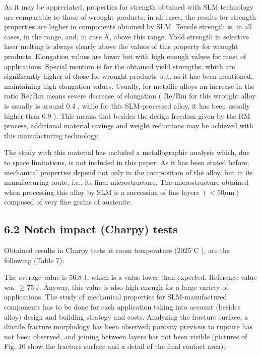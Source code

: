 \documentclass[10pt]{article}
\begin{document}
As it may be appreciated, properties for strength obtained with SLM technology are comparable to those of wrought products; in all cases, the results for strength properties are higher in components obtained by SLM. Tensile strength is, in all cases, in the range, and, in case A, above this range. Yield strength in selective laser melting is always clearly above the values of this property for wrought products. Elongation values are lower but with high enough values for most of applications. Special mention is for the obtained yield strengths, which are significantly higher of those for wrought products but, as it has been mentioned, maintaining high elongation values. Usually, for metallic alloys an increase in the ratio $\mathrm{Re} / \mathrm{Rm}$ means severe decrease of elongation ( $\mathrm{Re} / \mathrm{Rm}$ for this wrought alloy is usually is around 0.4 , while for this SLM-processed alloy, it has been usually higher than 0.9 ). This means that besides the design freedom given by the RM process, additional material savings and weight reductions may be achieved with this manufacturing technology.

The study with this material has included a metallographic analysis which, due to space limitations, is not included in this paper. As it has been stated before, mechanical properties depend not only in the composition of the alloy, but in its manufacturing route, i.e., its final microstructure. The microstructure obtained when processing this alloy by SLM is a succession of fine layers $(<50 \mu \mathrm{m})$ composed of very fine grains of austenite.

\subsection*{6.2 Notch impact (Charpy) tests}
Obtained results in Charpy tests at room temperature (20$25^{\circ} \mathrm{C}$ ), are the following (Table 7):

The average value is $56.8 \mathrm{~J}$, which is a value lower than expected. Reference value was $\geq 75 \mathrm{~J}$. Anyway, this value is also high enough for a large variety of applications. The study of mechanical properties for SLM-manufactured components has to be done for each application taking into account (besides alloy) design and building strategy and costs. Analyzing the fracture surface, a ductile fracture morphology has been observed; porosity previous to rupture has not been observed, and joining between layers has not been visible (pictures of Fig. 10 show the fracture surface and a detail of the final contact area).
\end{document}
